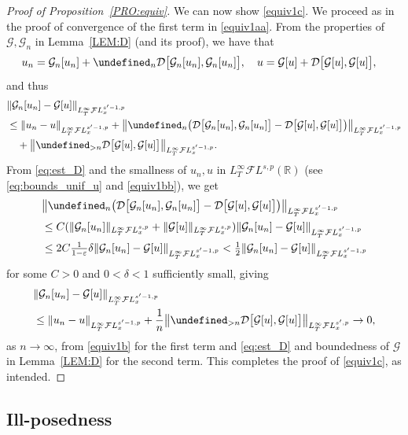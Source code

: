 \documentclass[a4paper,
11pt,  reqno]{amsart}
\newcommand{\5}{\textup{V}}
\newcommand{\FL}{\mathcal{F} L}
\newcommand{\dl}{\delta}
\newcommand{\eps}{\varepsilon}
\theoremstyle{remark}
\newcommand{\R}{\mathbb{R}}
\let\P= \undefined
\newcommand{\P}{\mathbf{P}}
\newcommand{\Gc}{\mathcal{G}}
\numberwithin{equation}{section}
\numberwithin{theorem}{section}
\newcommand{\DD}{\mathcal{D}}
\begin{document}
\begin{proof}[Proof of Proposition~\ref{PRO:equiv}]
We can now show \eqref{equiv1c}. We proceed as in the proof of convergence of the first term in \eqref{equiv1aa}. From the properties of $\Gc, \Gc_n$ in Lemma~\ref{LEM:D} (and its proof), we have that
\begin{align}
u_n &= \Gc_n[u_n] + \P_n \DD\big[ \Gc_n[u_n], \Gc_n[u_n]\big],
\quad
u = \Gc[u] +  \DD\big[ \Gc[u], \Gc[u]\big],
\end{align}
and thus
\begin{align}
&\| \Gc_n[u_n] - \Gc[u] \|_{L^\infty_T \FL^{s'-1,p}_x}
\\
&
\le \| u_n - u \|_{L^\infty_T \FL^{s'-1,p}_x}
+
\big\| \P_n \big(  \DD\big[ \Gc_n[u_n], \Gc_n[u_n]\big] -  \DD\big[ \Gc[u], \Gc[u]\big]  \big) \big\|_{L^\infty_T \FL^{s'-1,p}_x}
\\
&
\quad
+
\big\| \P_{>n} \DD\big[ \Gc[u], \Gc[u]\big] \big\|_{L^\infty_T \FL^{s'-1,p}_x}.
\end{align}
From \eqref{eq:est_D} and the smallness of $u_n,u$ in $L^\infty_T\FL^{s,p}(\R)$ (see \eqref{eq:bounds_unif_u} and
\eqref{equiv1bb}), we get
\begin{align}
&
\big\| \P_n \big(  \DD\big[ \Gc_n[u_n], \Gc_n[u_n]\big] -  \DD\big[ \Gc[u], \Gc[u]\big]  \big) \big\|_{L^\infty_T \FL^{s'-1,p}_x}
\\
&
\le C (\| \Gc_n[u_n] \|_{L^\infty_T \FL^{s,p}_x} + \| \Gc[u] \|_{L^\infty_T \FL^{s,p}_x}) \| \Gc_n[u_n] - \Gc[u] \|_{L^\infty_T \FL^{s'-1,p}_x}
\\
&
\le 2C \tfrac{1}{1-\eps} \dl  \| \Gc_n[u_n] - \Gc[u] \|_{L^\infty_T \FL^{s'-1,p}_x} < \tfrac12  \| \Gc_n[u_n] - \Gc[u] \|_{L^\infty_T \FL^{s'-1,p}_x}
\end{align}
for some $C>0$ and $0<\dl<1$ sufficiently small, giving
\begin{align}
&\| \Gc_n[u_n] - \Gc[u] \|_{L^\infty_T \FL^{s'-1,p}_x}
\\
&
\le \|u_n-u \|_{L^\infty_T \FL^{s'-1,p}_x} +
\frac1n\big\| \P_{>n} \DD\big[ \Gc[u], \Gc[u]\big] \big\|_{L^\infty_T \FL^{s',p}_x}
\to 0,
\end{align}
as $n\to\infty$, from \eqref{equiv1b} for the first term and \eqref{eq:est_D} and boundedness of $\Gc$ in Lemma~\ref{LEM:D} for the second term.
This completes the proof of
\eqref{equiv1c}, as intended. \qedhere

\end{proof}




\subsection{Ill-posedness}
\label{SUBSEC:ill}
\end{document}
